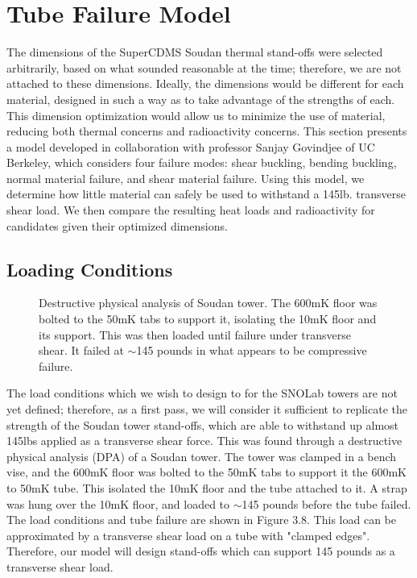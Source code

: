 \documentclass{report}
\begin{document}
\section{Tube Failure Model}

The dimensions of the SuperCDMS Soudan thermal stand-offs were selected arbitrarily, based on what sounded reasonable at the time; therefore, we are not attached to these dimensions. Ideally, the dimensions would be different for each material, designed in such a way as to take advantage of the strengths of each. This dimension optimization would allow us to minimize the use of material, reducing both thermal concerns and radioactivity concerns. This section presents a model developed in collaboration with professor Sanjay Govindjee of UC Berkeley, which considers four failure modes: shear buckling, bending buckling, normal material failure, and shear material failure. Using this model, we determine how little material can safely be used to withstand a 145lb. transverse shear load. We then compare the resulting heat loads and radioactivity for candidates given their optimized dimensions.

\subsection{Loading Conditions}

\begin{figure}[ht]
\centering
{}
\qquad
{}
\caption{Destructive physical analysis of Soudan tower. The 600mK floor was bolted to the 50mK tabs to support it, isolating the 10mK floor and its support. This was then loaded until failure under transverse shear. It failed at $\sim$145 pounds in what appears to be compressive failure.}
\end{figure}

The load conditions which we wish to design to for the SNOLab towers are not yet defined; therefore, as a first pass, we will consider it sufficient to replicate the strength of the Soudan tower stand-offs, which are able to withstand up almost 145lbs applied as a transverse shear force. This was found through a destructive physical analysis (DPA) of a Soudan tower. The tower was clamped in a bench vise, and the 600mK floor was bolted to the 50mK tabs to support it the 600mK to 50mK tube. This isolated the 10mK floor and the tube attached to it. A strap was hung over the 10mK floor, and loaded to $\sim$145 pounds before the tube failed. The load conditions and tube failure are shown in Figure 3.8. This load can be approximated by a transverse shear load on a tube with "clamped edges". Therefore, our model will design stand-offs which can support 145 pounds as a transverse shear load.
\end{document}
